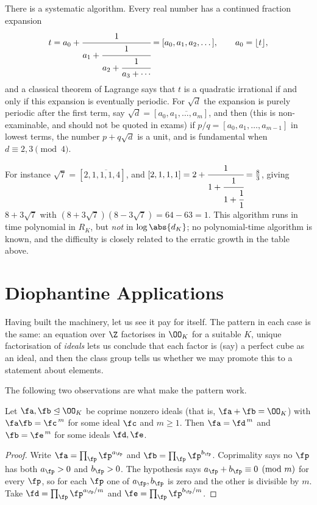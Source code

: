 \begin{remark}
	There is a systematic algorithm. Every real number has a continued fraction expansion
	$$t = a_0 + \cfrac{1}{a_1+\cfrac{1}{a_2+\cfrac{1}{a_3+\cdots}}} = [a_0,a_1,a_2,\dots], \qquad a_0 = \lfloor t\rfloor,$$
	and a classical theorem of Lagrange says that $t$ is a quadratic irrational if and only if this expansion is eventually periodic. For $\sqrt d$ the expansion is purely periodic after the first term, say $\sqrt d = [a_0,\overline{a_1,\dots,a_m}]$, and then (this is non-examinable, and should not be quoted in exams) if $p/q = [a_0,a_1,\dots,a_{m-1}]$ in lowest terms, the number $p+q\sqrt d$ is a unit, and is fundamental when $d \equiv 2,3\pmod4$.

	For instance $\sqrt7 = [2,\overline{1,1,1,4}]$, and $[2,1,1,1] = 2 + \cfrac{1}{1+\cfrac{1}{1+\cfrac11}} = \tfrac83$, giving $8+3\sqrt7$ with $(8+3\sqrt7)(8-3\sqrt7) = 64-63 = 1$. This algorithm runs in time polynomial in $R_K$, but \emph{not} in $\log\abs{d_K}$; no polynomial-time algorithm is known, and the difficulty is closely related to the erratic growth in the table above.
\end{remark}

\section{Diophantine Applications}\label{sec:applications}

Having built the machinery, let us see it pay for itself. The pattern in each case is the same: an equation over $\Z$ factorises in $\OO_K$ for a suitable $K$, unique factorisation of \emph{ideals} lets us conclude that each factor is (say) a perfect cube as an ideal, and then the class group tells us whether we may promote this to a statement about elements.

The following two observations are what make the pattern work.

\begin{lemma}\label{lem:coprimepower}
	Let $\fa, \fb \trianglelefteq \OO_K$ be coprime nonzero ideals (that is, $\fa+\fb = \OO_K$) with $\fa\fb = \fc^{\,m}$ for some ideal $\fc$ and $m \geq 1$. Then $\fa = \fd^{\,m}$ and $\fb = \fe^{\,m}$ for some ideals $\fd, \fe$.
\end{lemma}

\begin{proof}
	Write $\fa = \prod_\fp\fp^{a_\fp}$ and $\fb = \prod_\fp\fp^{b_\fp}$. Coprimality says no $\fp$ has both $a_\fp > 0$ and $b_\fp > 0$. The hypothesis says $a_\fp+b_\fp \equiv 0 \pmod m$ for every $\fp$, so for each $\fp$ one of $a_\fp, b_\fp$ is zero and the other is divisible by $m$. Take $\fd = \prod_\fp\fp^{a_\fp/m}$ and $\fe = \prod_\fp \fp^{b_\fp/m}$.
\end{proof}

